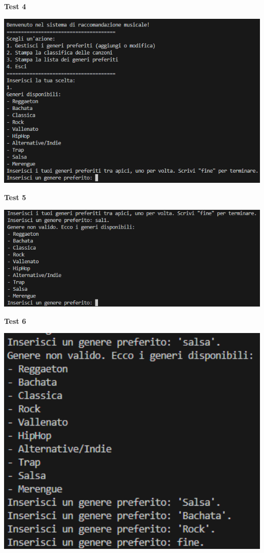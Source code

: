 \documentclass[a4paper,11pt]{article}
\begin{document}
\newpage
\begin{center}
    \textbf{Test 4}
    \par
    \vspace{0.5cm}
    \includegraphics[width=1\textwidth]{ptest4}
\end{center}
\begin{center}
    \textbf{Test 5}
    \par
    \vspace{0.5cm}
    \includegraphics[width=1\textwidth]{ptest5}
\end{center}
\begin{center}
    \textbf{Test 6}
    \par
    \vspace{0.5cm}
    \includegraphics[width=1\textwidth]{ptest6}
\end{center}
\end{document}
